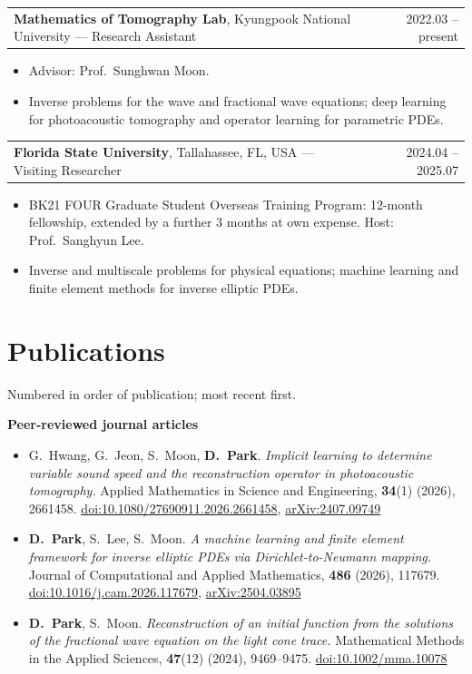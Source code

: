 \documentclass[11pt,a4paper]{article}
\makeatletter
\newcommand{\me}{\textbf{D.~Park}}
\newcommand{\entry}[2]{\noindent\begin{tabularx}{\textwidth}{@{}Xr@{}}#1 & #2\end{tabularx}\par}
\makeatother
\begin{document}
\entry{\textbf{Mathematics of Tomography Lab}, Kyungpook National University --- Research Assistant}{2022.03 -- present}
\begin{itemize}[nosep]
  \item Advisor: Prof.\ Sunghwan Moon.
  \item Inverse problems for the wave and fractional wave equations; deep learning for photoacoustic
    tomography and operator learning for parametric PDEs.
\end{itemize}
\vspace{0.4em}
\entry{\textbf{Florida State University}, Tallahassee, FL, USA --- Visiting Researcher}{2024.04 -- 2025.07}
\begin{itemize}[nosep]
  \item BK21 FOUR Graduate Student Overseas Training Program: 12-month fellowship,
    extended by a further 3 months at own expense. Host: Prof.\ Sanghyun Lee.
  \item Inverse and multiscale problems for physical equations; machine learning and finite element
    methods for inverse elliptic PDEs.
\end{itemize}

\section{Publications}

\noindent\small Numbered in order of publication; most recent first.\normalsize

\vspace{0.4em}
\noindent\textbf{Peer-reviewed journal articles}
\begin{itemize}[leftmargin=2.2em, itemsep=0.5em, topsep=0.4em]
  \item[{[4]}] G.~Hwang, G.~Jeon, S.~Moon, \me.
    \emph{Implicit learning to determine variable sound speed and the reconstruction operator in photoacoustic tomography.}
    Applied Mathematics in Science and Engineering, \textbf{34}(1) (2026), 2661458.
    \href{https://doi.org/10.1080/27690911.2026.2661458}{doi:10.1080/27690911.2026.2661458},
    \href{https://arxiv.org/abs/2407.09749}{arXiv:2407.09749}

  \item[{[3]}] \me, S.~Lee, S.~Moon.
    \emph{A machine learning and finite element framework for inverse elliptic PDEs via Dirichlet-to-Neumann mapping.}
    Journal of Computational and Applied Mathematics, \textbf{486} (2026), 117679.
    \href{https://doi.org/10.1016/j.cam.2026.117679}{doi:10.1016/j.cam.2026.117679},
    \href{https://arxiv.org/abs/2504.03895}{arXiv:2504.03895}

  \item[{[1]}] \me, S.~Moon.
    \emph{Reconstruction of an initial function from the solutions of the fractional wave equation on the light cone trace.}
    Mathematical Methods in the Applied Sciences, \textbf{47}(12) (2024), 9469--9475.
    \href{https://doi.org/10.1002/mma.10078}{doi:10.1002/mma.10078}
\end{itemize}
\end{document}
